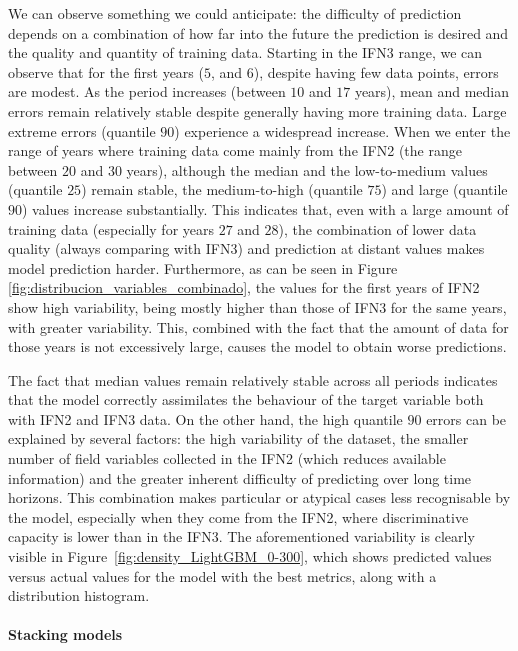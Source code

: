 We can observe something we could anticipate: the difficulty of prediction depends on a combination of how far into the future the prediction is desired and the quality and quantity of training data. Starting in the IFN3 range, we can observe that for the first years ($5$, and $6$), despite having few data points, errors are modest. As the period increases (between $10$ and $17$ years), mean and median errors remain relatively stable despite generally having more training data. Large extreme errors (quantile $90$) experience a widespread increase. When we enter the range of years where training data come mainly from the IFN2 (the range between $20$ and $30$ years), although the median and the low-to-medium values (quantile $25$) remain stable, the medium-to-high (quantile $75$) and large (quantile $90$) values increase substantially. This indicates that, even with a large amount of training data (especially for years $27$ and $28$), the combination of lower data quality (always comparing with IFN3) and prediction at distant values makes model prediction harder. Furthermore, as can be seen in Figure \ref{fig:distribucion_variables_combinado}, the values for the first years of IFN2 show high variability, being mostly higher than those of IFN3 for the same years, with greater variability. This, combined with the fact that the amount of data for those years is not excessively large, causes the model to obtain worse predictions.

The fact that median values remain relatively stable across all periods indicates that the model correctly assimilates the behaviour of the target variable both with IFN2 and IFN3 data. On the other hand, the high quantile $90$ errors can be explained by several factors: the high variability of the dataset, the smaller number of field variables collected in the IFN2 (which reduces available information) and the greater inherent difficulty of predicting over long time horizons. This combination makes particular or atypical cases less recognisable by the model, especially when they come from the IFN2, where discriminative capacity is lower than in the IFN3. The aforementioned variability is clearly visible in Figure~\ref{fig:density_LightGBM_0-300}, which shows predicted values versus actual values for the model with the best metrics, along with a distribution histogram.

\paragraph{Stacking models}

